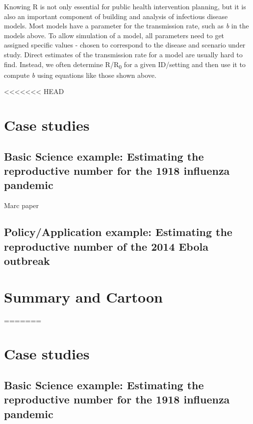 \documentclass[]{book}
\theoremstyle{definition}
\theoremstyle{definition}
\theoremstyle{definition}
\theoremstyle{remark}
\begin{document}
Knowing R is not only essential for public health intervention planning,
but it is also an important component of building and analysis of
infectious disease models. Most models have a parameter for the
transmission rate, such as \emph{b} in the models above. To allow
simulation of a model, all parameters need to get assigned specific
values - chosen to correspond to the disease and scenario under study.
Direct estimates of the transmission rate for a model are usually hard
to find. Instead, we often determine R/R\textsubscript{0} for a given
ID/setting and then use it to compute \emph{b} using equations like
those shown above.

<<<<<<< HEAD
\hypertarget{case-studies}{%
\section{Case studies}\label{case-studies}}

\hypertarget{basic-science-example-estimating-the-reproductive-number-for-the-1918-influenza-pandemic}{%
\subsection{Basic Science example: Estimating the reproductive number
for the 1918 influenza
pandemic}\label{basic-science-example-estimating-the-reproductive-number-for-the-1918-influenza-pandemic}}

Marc paper

\hypertarget{policyapplication-example-estimating-the-reproductive-number-of-the-2014-ebola-outbreak}{%
\subsection{Policy/Application example: Estimating the reproductive
number of the 2014 Ebola
outbreak}\label{policyapplication-example-estimating-the-reproductive-number-of-the-2014-ebola-outbreak}}

\hypertarget{summary-and-cartoon-1}{%
\section{Summary and Cartoon}\label{summary-and-cartoon-1}}
=======
\section{Case studies}\label{case-studies}

\subsection{Basic Science example: Estimating the reproductive number
for the 1918 influenza
pandemic}\label{basic-science-example-estimating-the-reproductive-number-for-the-1918-influenza-pandemic}
\end{document}
